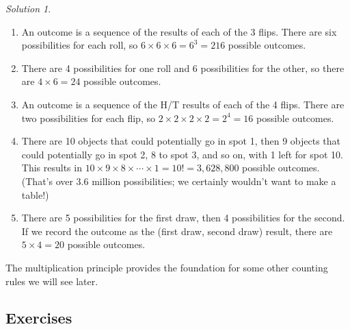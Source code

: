 \documentclass[
  letterpaper,
  DIV=11,
  numbers=noendperiod]{scrreprt}
\providecommand{\tightlist}{%
  \setlength{\itemsep}{0pt}\setlength{\parskip}{0pt}}
\theoremstyle{plain}
\theoremstyle{definition}
\theoremstyle{definition}
\theoremstyle{definition}
\theoremstyle{remark}
\newtheorem{refsolution}{Solution}[chapter]
\begin{document}
\begin{tcolorbox}[enhanced jigsaw, opacityback=0, rightrule=.15mm, coltitle=black, colframe=quarto-callout-tip-color-frame, toprule=.15mm, colbacktitle=quarto-callout-tip-color!10!white, opacitybacktitle=0.6, left=2mm, toptitle=1mm, breakable, title={Solution (click to expand)}, bottomtitle=1mm, colback=white, leftrule=.75mm, titlerule=0mm, arc=.35mm, bottomrule=.15mm]

\begin{refsolution}
\leavevmode

\begin{enumerate}
\def\labelenumi{\arabic{enumi}.}
\tightlist
\item
  An outcome is a sequence of the results of each of the 3 flips. There
  are six possibilities for each roll, so \(6\times6\times6= 6^3=216\)
  possible outcomes.
\item
  There are 4 possibilities for one roll and 6 possibilities for the
  other, so there are \(4\times 6 = 24\) possible outcomes.
\item
  An outcome is a sequence of the H/T results of each of the 4 flips.
  There are two possibilities for each flip, so
  \(2\times2\times2\times2 = 2^4=16\) possible outcomes.
\item
  There are 10 objects that could potentially go in spot 1, then 9
  objects that could potentially go in spot 2, 8 to spot 3, and so on,
  with 1 left for spot 10. This results in
  \(10\times9\times8\times\cdots\times1=10! = 3,628,800\) possible
  outcomes. (That's over 3.6 million possibilities; we certainly
  wouldn't want to make a table!)
\item
  There are 5 possibilities for the first draw, then 4 possibilities for
  the second. If we record the outcome as the (first draw, second draw)
  result, there are \(5\times4 = 20\) possible outcomes.
\end{enumerate}

\label{sol-multiplcation-rule-outcomes}

\end{refsolution}

\end{tcolorbox}

The multiplication principle provides the foundation for some other
counting rules we will see later.

\subsection{Exercises}\label{exercises-9}
\end{document}
